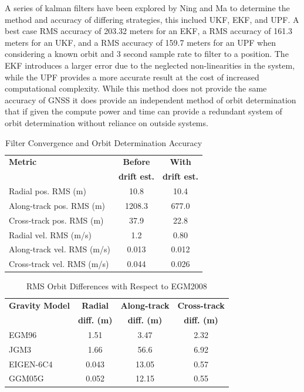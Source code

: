 \documentclass[conference]{IEEEtran}
\begin{document}
A series of kalman filters have been explored by Ning and Ma\cite{ningAnalysisFilteringMethods2011} to determine the method and accuracy of differing strategies, this inclued \ac{UKF}, \ac{EKF}, and \ac{UPF}. A best case \ac{RMS} accuracy of 203.32 meters for an \ac{EKF}, a \ac{RMS} accuracy of 161.3 meters for an \ac{UKF}, and a \ac{RMS} accuracy of 159.7 meters for an \ac{UPF} when considering a known orbit  and 3 second sample rate to filter to a position\cite{ningAnalysisFilteringMethods2011}. The \ac{EKF} introduces a larger error due to the neglected non-linearities in the system, while the \ac{UPF} provides a more accurate result at the cost of increased computational complexity\cite{ningAnalysisFilteringMethods2011}. While this method does not provide the same accuracy of \ac{GNSS} it does provide an independent method of orbit determination that if given the compute power and time can provide a redundant system of orbit determination without reliance on outside systems.



\begin{table}[H]
\renewcommand{\arraystretch}{1.1}
\caption{Filter Convergence and Orbit Determination Accuracy}
\label{tab:filter_results}
\centering
\small
\begin{tabular}{|l|c|c|}
\hline
\textbf{Metric} & \textbf{Before} & \textbf{With} \\
 & \textbf{drift est.} & \textbf{drift est.} \\
\hline
Radial pos. RMS (m) & 10.8 & 10.4 \\
\hline
Along-track pos. RMS (m) & 1208.3 & 677.0 \\
\hline
Cross-track pos. RMS (m) & 37.9 & 22.8 \\
\hline
Radial vel. RMS (m/s) & 1.2 & 0.80 \\
\hline
Along-track vel. RMS (m/s) & 0.013 & 0.012 \\
\hline
Cross-track vel. RMS (m/s) & 0.044 & 0.026 \\
\hline
\end{tabular}
\end{table}


\begin{table}[H]
\renewcommand{\arraystretch}{1.3}
\caption{RMS Orbit Differences with Respect to EGM2008}
\label{tab:gravity_model_comparison}
\centering
\begin{tabular}{|l|c|c|c|}
\hline
\textbf{Gravity Model} & \textbf{Radial} & \textbf{Along-track} & \textbf{Cross-track} \\
 & \textbf{diff. (m)} & \textbf{diff. (m)} & \textbf{diff. (m)} \\
\hline
EGM96 & 1.51 & 3.47 & 2.32 \\
\hline
JGM3 & 1.66 & 56.6 & 6.92 \\
\hline
EIGEN-6C4 & 0.043 & 13.05 & 0.57 \\
\hline
GGM05G & 0.052 & 12.15 & 0.55 \\
\hline
\end{tabular}
\end{table}
\end{document}
